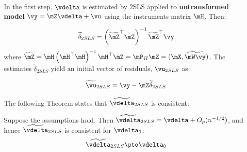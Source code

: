 \documentclass[english,12pt]{book}\usepackage[]{graphicx}\usepackage[]{xcolor}
\begin{document}
In the first step, $\vdelta$ is estimated by 2SLS applied to \textbf{untransformed model}  $\vy = \mZ\vdelta + \vu$ using the instruments matrix $\mH$. Then:


\begin{equation}
\widetilde{\delta}_{2SLS} = \left(\widetilde{\mZ}^\top\mZ\right)^{-1}\widetilde{\mZ}^\top\vy
\end{equation}
%
where $\widetilde{\mZ} = \mH\left(\mH^\top\mH\right)^{-1}\mH^\top\mZ = \mP_H\mZ = (\mX, \widetilde{\mW\vy})$. The estimates $\widetilde{\delta}_{2SLS}$ yield an initial vector of residuals, $\vu_{2SLS}$ as:

\begin{equation}
\widetilde{\vu}_{2SLS} = \vy - \mZ\widetilde{\delta}_{2SLS}
\end{equation}

The following Theorem states that $\widetilde{\vdelta}_{2SLS}$ is consistent:

\begin{theorem}\label{teo:Consistency-2sls}
Suppose the assumptions hold. Then $\widetilde{\vdelta}_{2SLS} = \vdelta + O_p(n^{-1/2})$, and hence $\widetilde{\vdelta}_{2SLS}$ is consistent for $\vdelta_0$:
\begin{equation*}
\widetilde{\vdelta}_{2SLS}\pto \vdelta_0
\end{equation*}
\end{theorem}
\end{document}
